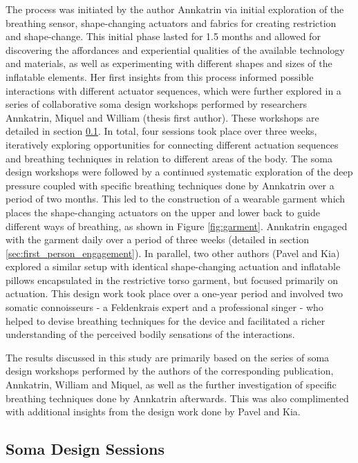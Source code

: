 The process was initiated by the author Annkatrin via initial exploration of the breathing sensor, shape-changing actuators and fabrics for creating restriction and shape-change. This initial phase lasted for 1.5 months and allowed for discovering the affordances and experiential qualities of the available technology and materials, as well as experimenting with different shapes and sizes of the inflatable elements. Her first insights from this process informed possible interactions with different actuator sequences, which were further explored in a series of collaborative soma design workshops \cite{designing_2018} performed by researchers Annkatrin, Miquel and William (thesis first author). These workshops are detailed in section \ref{sec:soma_workshops}. In total, four sessions took place over three weeks, iteratively exploring opportunities for connecting different actuation sequences and breathing techniques in relation to different areas of the body. The soma design workshops were followed by a continued systematic exploration of the deep pressure coupled with specific breathing techniques done by Annkatrin over a period of two months. This led to the construction of a wearable garment which places the shape-changing actuators on the upper and lower back to guide different ways of breathing, as shown in Figure \ref{fig:garment}. Annkatrin engaged with the garment daily over a period of three weeks (detailed in section \ref{sec:first_person_engagement}). In parallel, two other authors (Pavel and Kia) explored a similar setup with identical shape-changing actuation and inflatable pillows encapsulated in the restrictive torso garment, but focused primarily on actuation. This design work took place over a one-year period and involved two somatic connoisseurs - a Feldenkrais expert and a professional singer - who helped to devise breathing techniques for the device and facilitated a richer understanding of the perceived bodily sensations of the interactions.

The results discussed in this study are primarily based on the series of soma design workshops performed by the authors of the corresponding publication, Annkatrin, William and Miquel, as well as the further investigation of specific breathing techniques done by Annkatrin afterwards. This was also complimented with additional insights from the design work done by Pavel and Kia. 

\subsection{Soma Design Sessions}
\label{sec:soma_workshops}

